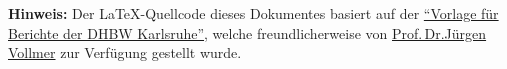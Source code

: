 \newpage
\onehalfspacing


\vspace{9cm}
\newcommand{\latex}{\LaTeX\xspace}
\begin{framed}
\justify \textbf{Hinweis:} Der \latex-Quellcode dieses Dokumentes basiert auf der \href{https://www.karlsruhe.dhbw.de/inf/studienverlauf-organisatorisches.html}{\enquote{Vorlage für Berichte der DHBW Karlsruhe}}, welche freundlicherweise von \href{mailto:juergen.vollmer@dhbw-karlsruhe.de}{Prof.\,Dr.\:Jürgen Vollmer} zur Verfügung gestellt wurde.
\end{framed}


\endinput
